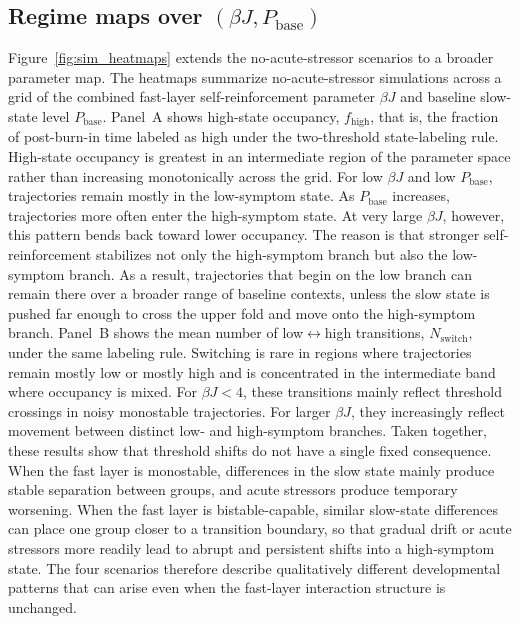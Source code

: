 \documentclass[man,12pt,floatsintext]{apa7}
\begin{document}
\subsection{Regime maps over \((\beta J, P_{\text{base}})\)}\label{sec:res_heatmaps}
Figure~\ref{fig:sim_heatmaps} extends the no-acute-stressor scenarios to a broader parameter map. The heatmaps summarize no-acute-stressor simulations across a grid of the combined fast-layer self-reinforcement parameter \(\beta J\) and baseline slow-state level \(P_{\text{base}}\).
Panel~A shows high-state occupancy, \(f_{\mathrm{high}}\), that is, the fraction of post-burn-in time labeled as high under the two-threshold state-labeling rule. High-state occupancy is greatest in an intermediate region of the parameter space rather than increasing monotonically across the grid. For low \(\beta J\) and low \(P_{\text{base}}\), trajectories remain mostly in the low-symptom state. As \(P_{\text{base}}\) increases, trajectories more often enter the high-symptom state. At very large \(\beta J\), however, this pattern bends back toward lower occupancy. The reason is that stronger self-reinforcement stabilizes not only the high-symptom branch but also the low-symptom branch. As a result, trajectories that begin on the low branch can remain there over a broader range of baseline contexts, unless the slow state is pushed far enough to cross the upper fold and move onto the high-symptom branch.
Panel~B shows the mean number of low\(\leftrightarrow\)high transitions, \(N_{\mathrm{switch}}\), under the same labeling rule. Switching is rare in regions where trajectories remain mostly low or mostly high and is concentrated in the intermediate band where occupancy is mixed. For \(\beta J<4\), these transitions mainly reflect threshold crossings in noisy monostable trajectories. For larger \(\beta J\), they increasingly reflect movement between distinct low- and high-symptom branches.
Taken together, these results show that threshold shifts do not have a single fixed consequence. When the fast layer is monostable, differences in the slow state mainly produce stable separation between groups, and acute stressors produce temporary worsening. When the fast layer is bistable-capable, similar slow-state differences can place one group closer to a transition boundary, so that gradual drift or acute stressors more readily lead to abrupt and persistent shifts into a high-symptom state. The four scenarios therefore describe qualitatively different developmental patterns that can arise even when the fast-layer interaction structure is unchanged.
\end{document}

